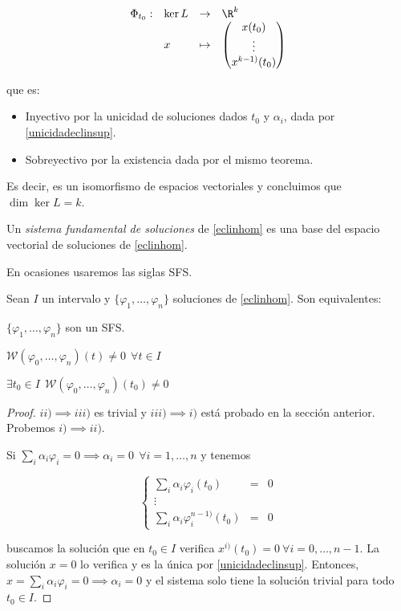 \[
\begin{array}{llll}
  \Phi_{t_0}: & \ker L & \to & \R^k\\
    & x & \mapsto & 
  \begin{pmatrix}
    x(t_0)\\
    \vdots\\
    x^{k-1)}(t_0)
  \end{pmatrix}
\end{array}
\]

que es:

\begin{itemize}
\item Inyectivo por la unicidad de soluciones dados $t_0$ y $\alpha_i$, dada por \ref{unicidadeclinsup}.
\item Sobreyectivo por la existencia dada por el mismo teorema.
\end{itemize}

Es decir, es un isomorfismo de espacios vectoriales y concluimos que $\dim \ker L = k$.

\begin{ndef}
  Un \emph{sistema fundamental de soluciones} de \eqref{eclinhom} es una base del espacio vectorial de soluciones de \eqref{eclinhom}.

  \begin{nota}
    En ocasiones usaremos las siglas SFS.
  \end{nota}
\end{ndef}

\begin{nprop}
  Sean $I$ un intervalo y $\{\varphi_1,\dots,\varphi_n\}$ soluciones de \eqref{eclinhom}. Son equivalentes:
  \begin{nlist}
  \item $\{\varphi_1,\dots,\varphi_n\}$ son un SFS.
  \item $\mathcal{W}(\varphi_0,\dots,\varphi_n)(t) \ne 0 \ \ \forall t\in I$
  \item $\exists t_0\in I \ \ \mathcal{W}(\varphi_0,\dots,\varphi_n)(t_0) \ne 0$
  \end{nlist}
\end{nprop}

\begin{proof}
  $ii)\implies iii)$ es trivial y $iii)\implies i)$ está probado en la sección anterior. Probemos $i) \implies ii)$.

  Si $\sum_i \alpha_i \varphi_i = 0 \implies \alpha_i = 0 \ \ \forall i=1,\dots,n$ y tenemos

  \[
  \left\{\begin{array}{lcl}
    \sum_i \alpha_i \varphi_i(t_0) & = & 0\\
    \vdots\\
    \sum_i \alpha_i \varphi^{n-1)}_i(t_0) & = & 0
  \end{array}\right.
  \]

  buscamos la solución que en $t_0\in I$ verifica $x^{i)}(t_0) = 0 \ \forall i=0,\dots,n-1$. La solución $x = 0$
  lo verifica y es la única por \ref{unicidadeclinsup}. Entonces, $x = \sum_i \alpha_i \varphi_i = 0 \implies \alpha_i = 0$ y
  el sistema solo tiene la solución trivial para todo $t_0\in I$.
  \end{proof}

